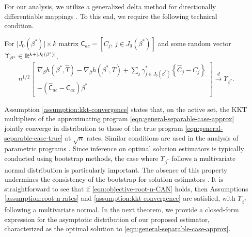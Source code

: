 For our analysis, we utilize a generalized delta method for directionally differentiable mappings \citep[e.g.,][]{shapiro1993asymptotic, shapiro2000statistical}. To this end, we require the following technical condition.
\begin{assumption}\label{assumption:kkt-convergence}
    For $ \vert J_0(\beta^*) \vert \times k$ matrix $\mathsf{C}_{ac} = \left[C_j, \, j \in J_0(\beta^*) \right]$ and some random vector $\Upsilon_{\beta^*} \in \mathbb{R}^{k + \vert J_0(\beta^*) \vert}$, 
	  \begin{align*}
            n^{1/2}\begin{bmatrix}
            \nabla_{\beta}h(\beta^*, \widehat{T}) - \nabla_{\beta}h(\beta^*,T) + \sum_j\gamma_{j \in J_0(\beta^*)}^*\left\{ \widehat{C}_j - C_j \right\} \\
            -(\widehat{\mathsf{C}}_{ac} - \mathsf{C}_{ac})\beta^*
            \end{bmatrix} \xrightarrow{d} \Upsilon_{\beta^*}.
        \end{align*}
\end{assumption}
Assumption \ref{assumption:kkt-convergence} states that, on the active set, the KKT multipliers of the approximating program \ref{eqn:general-separable-case-approx} jointly converge in distribution to those of the true program \ref{eqn:general-separable-case-true} at $\sqrt{n}$ rates. Similar conditions are used in the analysis of parametric programs \citep[e.g.,][]{ shapiro1990differential}. Since inference on optimal solution estimators is typically conducted using bootstrap methods, the case where $\Upsilon_{\beta^*}$ follows a multivariate normal distribution is particularly important. The absence of this property undermines the consistency of the bootstrap for solution estimators \citep{fang2019inference}.
It is straightforward to see that if \eqref{eqn:objective-root-n-CAN} holds, then Assumptions \ref{assumption:root-n-rates} and \ref{assumption:kkt-convergence} are satisfied, with $\Upsilon_{\beta^*}$ following a multivariate normal. In the next theorem, we provide a closed-form expression for the asymptotic distribution of our proposed estimator, characterized as the optimal solution to \ref{eqn:general-separable-case-approx}.

